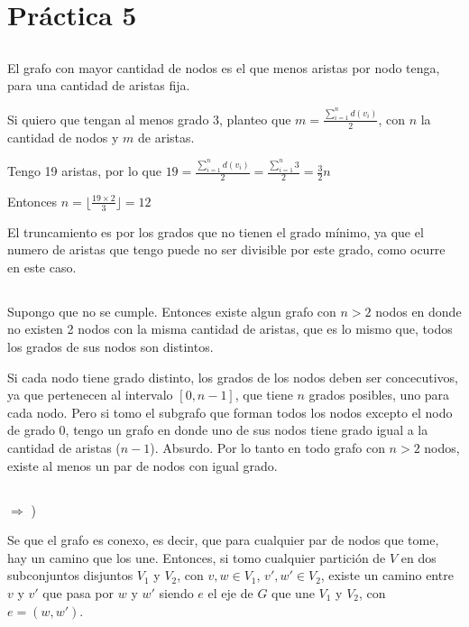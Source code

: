 \section{Práctica 5}

\subsection{}

El grafo con mayor cantidad de nodos es el que menos aristas por nodo tenga, para una cantidad de aristas fija.

Si quiero que tengan al menos grado 3, planteo que $m = \frac{\sum_{i = 1}^{n}d(v_i)}{2}$, con $n$ la cantidad de nodos y $m$ de aristas.

Tengo 19 aristas, por lo que $19 = \frac{\sum_{i = 1}^{n}d(v_i)}{2} = \frac{\sum_{i = 1}^{n}3}{2} = \frac{3}{2}n$

Entonces $n = \lfloor \frac{19 \times 2}{3}\rfloor = 12$

El truncamiento es por los grados que no tienen el grado mínimo, ya que el numero de aristas que tengo puede no ser divisible por este grado, como ocurre en este caso.

\setcounter{subsection}{3}
\subsection{}

Supongo que no se cumple. Entonces existe algun grafo con $n > 2$ nodos en donde no existen 2 nodos con la misma cantidad de aristas, que es lo mismo que, todos los grados de sus nodos son distintos.

Si cada nodo tiene grado distinto, los grados de los nodos deben ser concecutivos, ya que pertenecen al intervalo $[0, n - 1]$, que tiene $n$ grados posibles, uno para cada nodo. Pero si tomo el subgrafo que forman todos los nodos excepto el nodo de grado 0, tengo un grafo en donde uno de sus nodos tiene grado igual a la cantidad de aristas ($n - 1$). Absurdo. Por lo tanto en todo grafo con $n > 2$ nodos, existe al menos un par de nodos con igual grado.

\setcounter{subsection}{5}
\subsection{}

$\Longrightarrow$ )

Se que el grafo es conexo, es decir, que para cualquier par de nodos que tome, hay un camino que los une. Entonces, si tomo cualquier partición de $V$ en dos subconjuntos disjuntos $V_1$ y $V_2$, con $v, w \in V_1$, $v', w' \in V_2$, existe un camino entre $v$ y $v'$ que pasa por $w$ y $w'$ siendo $e$ el eje de $G$ que une $V_1$ y $V_2$, con $e = (w, w')$. \\

